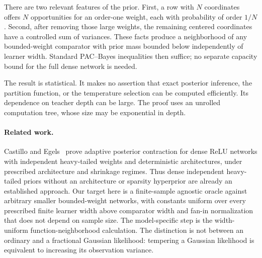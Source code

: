 \documentclass[11pt]{article}
\theoremstyle{remark}\newtheorem{remark}[theorem]{Remark}
\begin{document}
There are two relevant features of the prior. First, a row with $N$ coordinates offers $N$ opportunities for an order-one weight, each with probability of order $1/N$. Second, after removing those large weights, the remaining centered coordinates have a controlled sum of variances. These facts produce a neighborhood of any bounded-weight comparator with prior mass bounded below independently of learner width. Standard PAC--Bayes inequalities then suffice; no separate capacity bound for the full dense network is needed.

The result is statistical. It makes no assertion that exact posterior inference, the partition function, or the temperature selection can be computed efficiently. Its dependence on teacher depth can be large. The proof uses an unrolled computation tree, whose size may be exponential in depth.

\paragraph{Related work.}
Castillo and Egels~\cite{castillo-egels} prove adaptive posterior contraction for dense ReLU networks with independent heavy-tailed weights and deterministic architectures, under prescribed architecture and shrinkage regimes. Thus dense independent heavy-tailed priors without an architecture or sparsity hyperprior are already an established approach. Our target here is a finite-sample agnostic oracle against arbitrary smaller bounded-weight networks, with constants uniform over every prescribed finite learner width above comparator width and fan-in normalization that does not depend on sample size. The model-specific step is the width-uniform function-neighborhood calculation. The distinction is not between an ordinary and a fractional Gaussian likelihood: tempering a Gaussian likelihood is equivalent to increasing its observation variance.
\end{document}
